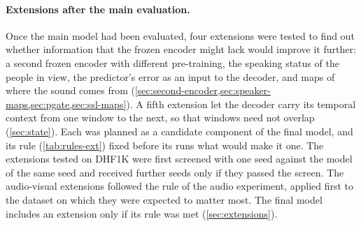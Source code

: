 \paragraph{Extensions after the main evaluation.} Once the main model had been
evaluated, four extensions were tested to find out whether information that
the frozen encoder might lack would improve it further: a second frozen
encoder with different pre-training, the speaking status of the people in
view, the predictor's error as an input to the decoder, and maps of where the
sound comes from
(\cref{sec:second-encoder,sec:speaker-maps,sec:pgate,sec:ssl-maps}). A fifth
extension let the decoder carry its temporal context from one window to the
next, so that windows need not overlap (\cref{sec:state}). Each
was planned as a candidate component of the final model, and its rule
(\cref{tab:rules-ext}) fixed before its runs what would make it one.
The extensions tested on DHF1K were first screened with one seed against the
model of the same seed and received further seeds only if they passed the
screen. The audio-visual extensions followed the rule of the audio experiment,
applied first to the dataset on which they were expected to matter most. The
final model includes an extension only if its rule was met
(\cref{sec:extensions}).

